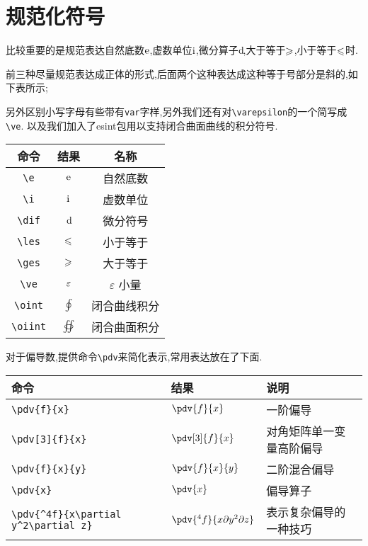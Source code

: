 \documentclass[lang=cn,12pt,scheme=chinese,mode=simple,black]{elegantbook}
\begin{document}
\section{规范化符号}
比较重要的是规范表达自然底数$\mathrm{e}$,虚数单位$\mathrm{i}$,微分算子$\operatorname{d\!}$,大于等于$\geqslant$,小于等于$\leqslant$时.

前三种尽量规范表达成正体的形式,后面两个这种表达成这种等于号部分是斜的,如下表所示;

另外区别小写字母有些带有\verb|var|字样,另外我们还有对\verb|\varepsilon|的一个简写成\verb|\ve|.
以及我们加入了esint包用以支持闭合曲面曲线的积分符号.

\begin{center}
\setlength{\tabcolsep}{10pt}
\begin{tabular}{|c|c|c|}
\hline
\textbf{命令} & \textbf{结果} & \textbf{名称}\\
\hline
\verb|\e| & $\mathrm{e}$ & 自然底数 \\
\verb|\i| & $\mathrm{i}$ & 虚数单位 \\
\verb|\dif| & $\operatorname{d\!}$ & 微分符号 \\
\verb|\les| & $\leqslant$ & 小于等于 \\
\verb|\ges| & $\geqslant$ & 大于等于 \\
\verb|\ve| & $\varepsilon$ & $\varepsilon$ 小量 \\
\verb|\oint| & $\oint$ & 闭合曲线积分 \\
\verb|\oiint| & $\oiint$ & 闭合曲面积分 \\
\hline
\end{tabular}
\end{center}

对于偏导数,提供命令\verb|\pdv|来简化表示,常用表达放在了下面.
\begin{center}
\renewcommand{\arraystretch}{1.4}
\setlength{\tabcolsep}{10pt}
\begin{tabular}{|l|l|l|}
\hline
\textbf{命令} & \textbf{结果} & \textbf{说明} \\
\hline
\verb|\pdv{f}{x}| & $\pdv{f}{x}$ & 一阶偏导 \\
\verb|\pdv[3]{f}{x}| & $\pdv[3]{f}{x}$ & 对角矩阵单一变量高阶偏导 \\
\verb|\pdv{f}{x}{y}| & $\pdv{f}{x}{y}$ & 二阶混合偏导 \\
\verb|\pdv{x}| & $\pdv{x}$ & 偏导算子 \\
\verb|\pdv{^4f}{x\partial y^2\partial z}| & $\pdv{^4f}{x\partial y^2\partial z}$ & 表示复杂偏导的一种技巧 \\

\hline
\end{tabular}
\end{center}
\end{document}

